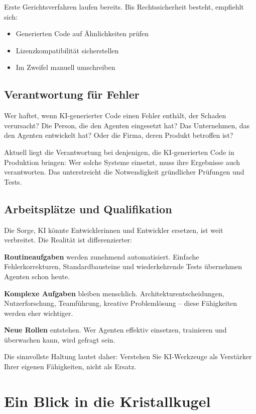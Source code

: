 Erste Gerichtsverfahren laufen bereits. Bis Rechtssicherheit besteht, empfiehlt sich:
\begin{itemize}
  \item Generierten Code auf Ähnlichkeiten prüfen
  \item Lizenzkompatibilität sicherstellen
  \item Im Zweifel manuell umschreiben
\end{itemize}

\subsection{Verantwortung für Fehler}

Wer haftet, wenn KI-generierter Code einen Fehler enthält, der Schaden verursacht? Die Person, die den Agenten eingesetzt hat? Das Unternehmen, das den Agenten entwickelt hat? Oder die Firma, deren Produkt betroffen ist?

Aktuell liegt die Verantwortung bei denjenigen, die KI-generierten Code in Produktion bringen: Wer solche Systeme einsetzt, muss ihre Ergebnisse auch verantworten. Das unterstreicht die Notwendigkeit gründlicher Prüfungen und Tests.

\subsection{Arbeitsplätze und Qualifikation}

Die Sorge, KI könnte Entwicklerinnen und Entwickler ersetzen, ist weit verbreitet. Die Realität ist differenzierter:

\textbf{Routineaufgaben} werden zunehmend automatisiert. Einfache Fehlerkorrekturen, Standardbausteine und wiederkehrende Tests übernehmen Agenten schon heute.

\textbf{Komplexe Aufgaben} bleiben menschlich. Architekturentscheidungen, Nutzerforschung, Teamführung, kreative Problemlösung – diese Fähigkeiten werden eher wichtiger.

\textbf{Neue Rollen} entstehen. Wer Agenten effektiv einsetzen, trainieren und überwachen kann, wird gefragt sein.

Die sinnvollste Haltung lautet daher: Verstehen Sie KI-Werkzeuge als Verstärker Ihrer eigenen Fähigkeiten, nicht als Ersatz.


\section{Ein Blick in die Kristallkugel}

